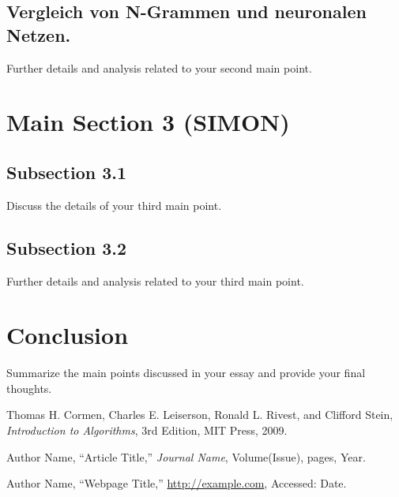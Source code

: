\documentclass[12pt]{article}
\begin{document}
\subsection{Vergleich von N-Grammen und neuronalen Netzen.}
Further details and analysis related to your second main point.

\section{Main Section 3 (SIMON)}
\subsection{Subsection 3.1}
Discuss the details of your third main point.
\subsection{Subsection 3.2}
Further details and analysis related to your third main point.

\section{Conclusion}
Summarize the main points discussed in your essay and provide your final thoughts.

\newpage
\begin{thebibliography}{9}

Thomas H. Cormen, Charles E. Leiserson, Ronald L. Rivest, and Clifford Stein, \textit{Introduction to Algorithms}, 3rd Edition, MIT Press, 2009.

Author Name, ``Article Title,'' \textit{Journal Name}, Volume(Issue), pages, Year.

Author Name, ``Webpage Title,'' \url{http://example.com}, Accessed: Date.

\end{thebibliography}
\end{document}

